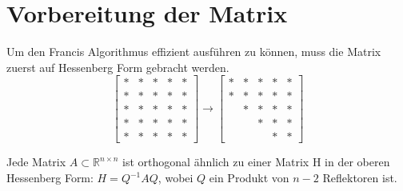\section{Vorbereitung der Matrix\label{francis:section:vorbereitung}}
Um den Francis Algorithmus effizient ausführen zu können, muss die Matrix zuerst auf Hessenberg Form gebracht werden.
\begin{equation}
	\begin{bmatrix}
	* & * & * & * & * \\
	* & * & * & * & * \\
	*& * & * & * & * \\
	*&  * & * & * & * \\
	*&  * &  * & * & *
	\end{bmatrix} \rightarrow
	\begin{bmatrix}
	* & * & * & * & * \\
	* & * & * & * & * \\
	& * & * & * & * \\
	&   & * & * & * \\
	&   &   & * & *
	\end{bmatrix}
\end{equation}

\begin{satz}
	Jede Matrix $ A \subset \mathbb{R} ^{n \times n} $ ist orthogonal ähnlich zu einer Matrix H in der oberen Hessenberg Form: $ H=Q^{-1}AQ $, wobei $Q$ ein Produkt von $n-2$ Reflektoren ist.
\end{satz}

